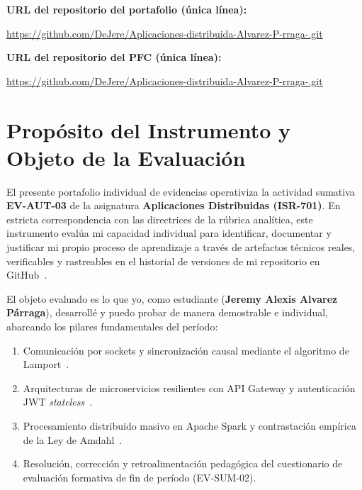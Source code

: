 \documentclass[11pt,a4paper]{article}
\begin{document}
\begin{titlepage}
    \vspace{1.0cm}

    \textbf{URL del repositorio del portafolio (única línea):}\par
    \vspace{0.2cm}
    \url{https://github.com/DeJere/Aplicaciones-distribuida-Alvarez-P-rraga-.git}\par

    \vspace{0.6cm}

    \textbf{URL del repositorio del PFC (única línea):}\par
    \vspace{0.2cm}
    \url{https://github.com/DeJere/Aplicaciones-distribuida-Alvarez-P-rraga-.git}\par

\end{titlepage}

\section{Propósito del Instrumento y Objeto de la Evaluación}

El presente portafolio individual de evidencias operativiza la actividad sumativa \textbf{EV-AUT-03} de la asignatura \textbf{Aplicaciones Distribuidas (ISR-701)}. En estricta correspondencia con las directrices de la rúbrica analítica, este instrumento evalúa mi capacidad individual para identificar, documentar y justificar mi propio proceso de aprendizaje a través de artefactos técnicos reales, verificables y rastreables en el historial de versiones de mi repositorio en GitHub~\cite{panadero2017effects,buffardi2020assessing}.

El objeto evaluado es lo que yo, como estudiante (\textbf{Jeremy Alexis Alvarez Párraga}), desarrollé y puedo probar de manera demostrable e individual, abarcando los pilares fundamentales del período:
\begin{enumerate}[label=\textbf{(\arabic*)}]
    \item Comunicación por sockets y sincronización causal mediante el algoritmo de Lamport~\cite{lamport1978time}.
    \item Arquitecturas de microservicios resilientes con API Gateway y autenticación JWT \textit{stateless}~\cite{newman2021building}.
    \item Procesamiento distribuido masivo en Apache Spark y contrastación empírica de la Ley de Amdahl~\cite{amdahl1967,armbrust2015sparksql}.
    \item Resolución, corrección y retroalimentación pedagógica del cuestionario de evaluación formativa de fin de período (EV-SUM-02).
\end{enumerate}
\end{document}
